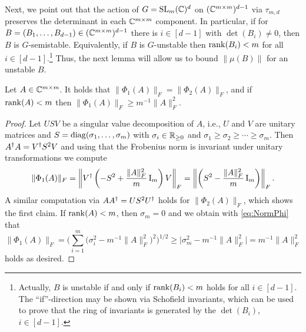Next, we point out that the action of $G = \operatorname{SL}_m(\mathbb C)^d$ on $(\mathbb C^{m \times m})^{d-1}$ via $\tau_{m,d}$ preserves the determinant in each $\mathbb C^{m \times m}$ component. In particular, if for $B = (B_1,\ldots,B_{d-1}) \in (\mathbb C^{m \times m})^{d-1}$ there is $i \in [d-1]$ with $\det(B_i) \neq 0$, then $B$ is $G$-semistable. Equivalently, if $B$ is $G$-unstable then $\operatorname{rank}(B_i) < m$ for all $i \in [d-1]$.\footnote{Actually, $B$ is unstable if and only if $\operatorname{rank}(B_i) < m$ holds for all $i \in [d-1]$. The ``if''-direction may be shown via Schofield invariants, which can be used to prove that the ring of invariants is generated by the $\det(B_i)$, $i \in [d-1]$.}
Thus, the next lemma will allow us to bound $\|\mu(B)\|$ for an unstable $B$.

\begin{lemma} \label{lem:LargeGapQuiver}
	Let $A \in \mathbb C^{m \times m}$. It holds that $\| \Phi_1(A) \|_F = \| \Phi_2(A) \|_F$, and if $\operatorname{rank}(A) < m$ then $\| \Phi_1(A)\|_F \geq m^{-1} \|A\|^2_F$.
\end{lemma}

\begin{proof}
	Let $U S V$ be a singular value decomposition of $A$, i.e., $U$ and $V$ are unitary matrices and $S = \operatorname{diag}(\sigma_1,\ldots,\sigma_m)$ with $\sigma_i \in \mathbb R_{\geq 0}$ and $\sigma_1 \geq \sigma_2 \geq \cdots \geq \sigma_m$. Then $A^{\dagger} A = V^{\dagger} S^2 V$ and using that the Frobenius norm is invariant under unitary transformations we compute
		\begin{equation} \label{eq:NormPhi}
			\|\Phi_1(A)\|_F = \left\| V^{\dagger} \left( - S^2 + \frac{\|A\|^2_F}{m} \operatorname{I}_m \right) V \right\|_F
			= \left\| \left( S^2 - \frac{\|A\|^2_F}{m} \operatorname{I}_m \right) \right\|_F  .
		\end{equation}
	A similar computation via $A A^{\dagger} = U S^2 U^{\dagger}$ holds for $\| \Phi_2(A) \|_F$, which shows the first claim.
	If $\operatorname{rank}(A) < m$, then $\sigma_m = 0$ and we obtain with \eqref{eq:NormPhi} that 
		\[ \|\Phi_1(A)\|_F  = \Big( \sum_{i=1}^m \big( \sigma_i^2 - m^{-1}\|A\|^2_F \big)^2 \Big)^{1/2}
		\geq \Big| \sigma_m^2 - m^{-1}\|A\|^2_F \Big| = m^{-1} \|A\|_F^2   \]
	holds as desired.
\end{proof}



